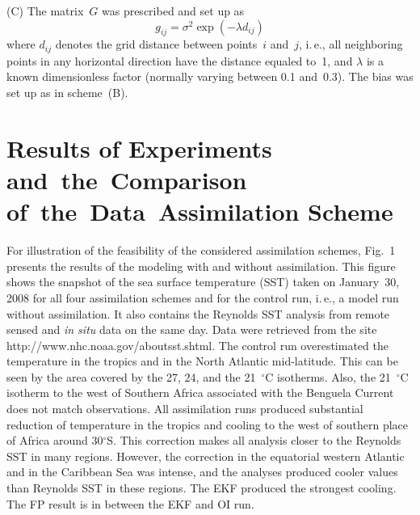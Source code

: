 \begin{multicols}{2}
(C) The matrix~$G$ was prescribed and set up as
$$
g_{ij} =\sigma ^{2} \exp (-\lambda d_{ij} )$$ 
where $d_{ij} $ denotes the grid distance between points~$i$  and~$j$, i.\,e., 
all neighboring points in any horizontal direction have the distance equaled to~1, and  
$\lambda $ is a known dimensionless factor (normally varying between 0.1 and~0.3). 
The bias was set up as in scheme~(B).

\section{Results of Experiments and~the~Comparison of~the~Data~Assimilation Scheme} 

\noindent
For illustration of the feasibility of the considered assimilation schemes, Fig.~1 
presents the results of the modeling with and without assimilation. This figure 
shows the snapshot of the sea surface temperature (SST) taken on January~30, 2008 
for all four assimilation schemes and for the control run, i.\,e., a model run without 
assimilation. It also contains the Reynolds SST analysis from remote sensed and \textit{in situ} 
data on the same day. Data were retrieved from the site {\sf http://www.nhc.noaa.gov/aboutsst.shtml}. 
The control run overestimated the temperature in the tropics and in the North Atlantic mid-latitude. 
This can be seen by the area covered by the 27, 24, and the 21~$^\circ$C isotherms. 
Also, the 21~$^\circ$C isotherm to the west of Southern Africa associated with the Benguela 
Current does not match observations. All assimilation runs produced substantial reduction 
of temperature in the tropics and cooling to the west of southern place of Africa 
around 30$^\circ$S. This correction makes all analysis closer to the Reynolds 
SST in many regions. However, the correction in the equatorial western Atlantic 
and in the Caribbean Sea was intense, and the analyses produced cooler values 
than Reynolds SST in these regions. The EKF produced the strongest cooling. The FP 
result is in between the EKF and OI run.

\begin{figure*} %
\vspace*{1pt}
 \begin{center}
 \mbox{%
 \epsfxsize=140.719mm
 }
 \end{center}
 \vspace*{-9pt}
\end{figure*}




\end{multicols}

